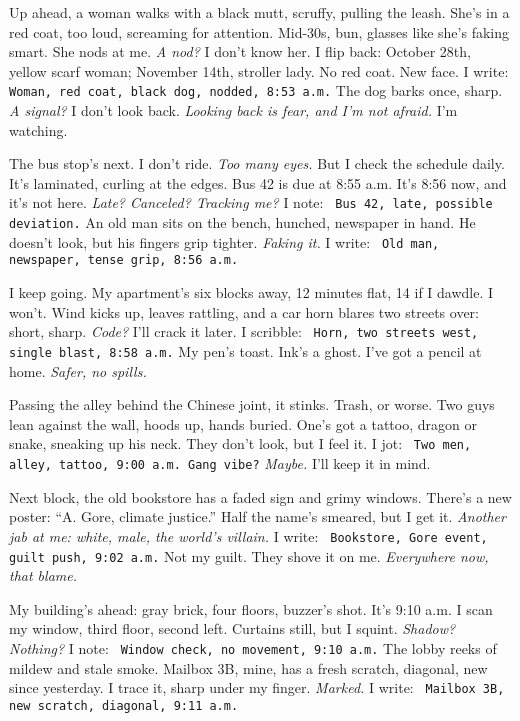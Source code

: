\documentclass[12pt]{article}
\newcommand{\note}[1]{\texttt{\small \color{DarkGray} #1}}
\begin{document}
Up ahead, a woman walks with a black mutt, scruffy, pulling the leash. She’s in a red coat, too loud, screaming for attention. Mid-30s, bun, glasses like she’s faking smart. She nods at me. \textit{A nod?} I don’t know her. I flip back: October 28th, yellow scarf woman; November 14th, stroller lady. No red coat. New face. I write: \note{Woman, red coat, black dog, nodded, 8:53 a.m.} The dog barks once, sharp. \textit{A signal?} I don’t look back. \textit{Looking back is fear, and I’m not afraid.} I’m watching.

The bus stop’s next. I don’t ride. \textit{Too many eyes.} But I check the schedule daily. It’s laminated, curling at the edges. Bus 42 is due at 8:55 a.m. It’s 8:56 now, and it’s not here. \textit{Late? Canceled? Tracking me?} I note: \note{Bus 42, late, possible deviation.} An old man sits on the bench, hunched, newspaper in hand. He doesn’t look, but his fingers grip tighter. \textit{Faking it.} I write: \note{Old man, newspaper, tense grip, 8:56 a.m.}

I keep going. My apartment’s six blocks away, 12 minutes flat, 14 if I dawdle. I won’t. Wind kicks up, leaves rattling, and a car horn blares two streets over: short, sharp. \textit{Code?} I’ll crack it later. I scribble: \note{Horn, two streets west, single blast, 8:58 a.m.} My pen’s toast. Ink’s a ghost. I’ve got a pencil at home. \textit{Safer, no spills.}

Passing the alley behind the Chinese joint, it stinks. Trash, or worse. Two guys lean against the wall, hoods up, hands buried. One’s got a tattoo, dragon or snake, sneaking up his neck. They don’t look, but I feel it. I jot: \note{Two men, alley, tattoo, 9:00 a.m. Gang vibe?} \textit{Maybe.} I’ll keep it in mind.

Next block, the old bookstore has a faded sign and grimy windows. There’s a new poster: “\textnormal{A. Gore}, climate justice.” Half the name’s smeared, but I get it. \textit{Another jab at me: white, male, the world’s villain.} I write: \note{Bookstore, Gore event, guilt push, 9:02 a.m.} Not my guilt. They shove it on me. \textit{Everywhere now, that blame.}

My building’s ahead: gray brick, four floors, buzzer’s shot. It’s 9:10 a.m. I scan my window, third floor, second left. Curtains still, but I squint. \textit{Shadow? Nothing?} I note: \note{Window check, no movement, 9:10 a.m.} The lobby reeks of mildew and stale smoke. Mailbox 3B, mine, has a fresh scratch, diagonal, new since yesterday. I trace it, sharp under my finger. \textit{Marked.} I write: \note{Mailbox 3B, new scratch, diagonal, 9:11 a.m.}
\end{document}

